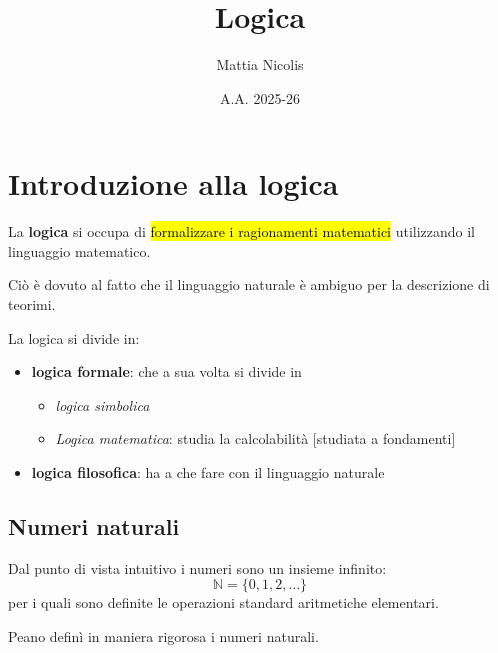 \documentclass[a4paper, 12pt]{book}
\title{\textbf{Logica}}
\author{Mattia Nicolis}
\date{A.A. 2025-26}
\begin{document}
    \maketitle

    \tableofcontents
    \markboth{}{}

    \chapter*{Introduzione alla logica}
    La \textbf{logica} si occupa di \hl{formalizzare i ragionamenti matematici} utilizzando il linguaggio matematico.

    Ciò è dovuto al fatto che il linguaggio naturale è ambiguo per la descrizione di teorimi.

    La logica si divide in:
    \begin{itemize}
      \item \textbf{logica formale}: che a sua volta si divide in
      \begin{itemize}
        \item \textit{logica simbolica}
        \item \textit{Logica matematica}: studia la calcolabilità [studiata a fondamenti] 
      \end{itemize}
      \item \textbf{logica filosofica}: ha a che fare con il linguaggio naturale
    \end{itemize}

    \section*{Numeri naturali}
    Dal punto di vista intuitivo i numeri sono un insieme infinito:
    \begin{equation*}
      \mathbb{N} = \{0, 1, 2, \dots\}
    \end{equation*}
    per i quali sono definite le operazioni standard aritmetiche elementari.

    Peano definì in maniera rigorosa i numeri naturali.
\end{document}
